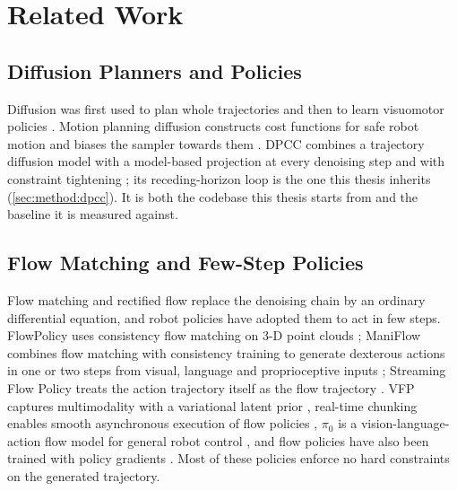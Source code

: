 \chapter{Related Work}\label{ch:related}

\section{Diffusion Planners and Policies}\label{sec:rel:diffusion}

Diffusion was first used to plan whole trajectories \parencite{janner2022planning} and then to learn
visuomotor policies \parencite{chi2023diffusion}. Motion planning diffusion constructs cost functions
for safe robot motion and biases the sampler towards them \parencite{carvalho2025motion}. \ac{DPCC}
combines a trajectory diffusion model with a model-based projection at every denoising step and with
constraint tightening \parencite{romer2025diffusion}; its receding-horizon loop is the one this thesis
inherits (\autoref{sec:method:dpcc}). It is both the codebase this thesis starts from and the baseline it
is measured against.

\section{Flow Matching and Few-Step Policies}\label{sec:rel:fm}

Flow matching \parencite{lipman2023flow,lipman2024guide} and rectified flow \parencite{liu2023flow}
replace the denoising chain by an ordinary differential equation, and robot policies have adopted them
to act in few steps. FlowPolicy uses consistency flow matching on 3-D point clouds
\parencite{zhang2024flowpolicy}; ManiFlow combines flow matching with consistency training to generate
dexterous actions in one or two steps from visual, language and proprioceptive inputs
\parencite{yan2025maniflow}; Streaming Flow Policy treats the action trajectory itself as the flow
trajectory \parencite{jiang2025streaming}. VFP captures multimodality with a variational latent prior
\parencite{zhai2025vfp}, real-time chunking enables smooth asynchronous execution of flow policies
\parencite{black2025rtc}, $\pi_0$ is a vision-language-action flow model for general robot control
\parencite{black2024pi0}, and flow policies have also been trained with policy gradients
\parencite{yi2026fpg}. Most of these policies enforce no hard constraints on the generated
trajectory.

